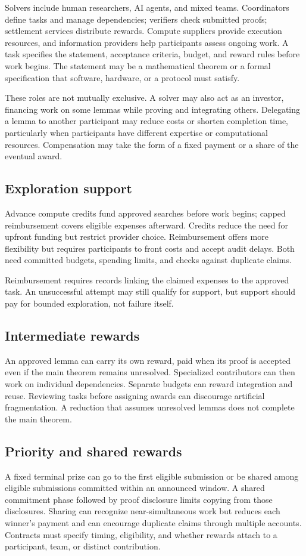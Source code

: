 \documentclass[11pt,a4paper,reqno]{amsart}
\numberwithin{equation}{section}
\begin{document}
Solvers include human researchers, AI agents, and mixed teams. Coordinators define tasks and manage dependencies; verifiers check submitted proofs; settlement services distribute rewards. Compute suppliers provide execution resources, and information providers help participants assess ongoing work. A task specifies the statement, acceptance criteria, budget, and reward rules before work begins. The statement may be a mathematical theorem or a formal specification that software, hardware, or a protocol must satisfy.

These roles are not mutually exclusive. A solver may also act as an investor, financing work on some lemmas while proving and integrating others. Delegating a lemma to another participant may reduce costs or shorten completion time, particularly when participants have different expertise or computational resources. Compensation may take the form of a fixed payment or a share of the eventual award.

\subsection{Exploration support}
Advance compute credits fund approved searches before work begins; capped reimbursement covers eligible expenses afterward. Credits reduce the need for upfront funding but restrict provider choice. Reimbursement offers more flexibility but requires participants to front costs and accept audit delays. Both need committed budgets, spending limits, and checks against duplicate claims.

Reimbursement requires records linking the claimed expenses to the approved task. An unsuccessful attempt may still qualify for support, but support should pay for bounded exploration, not failure itself.

\subsection{Intermediate rewards}
An approved lemma can carry its own reward, paid when its proof is accepted even if the main theorem remains unresolved. Specialized contributors can then work on individual dependencies. Separate budgets can reward integration and reuse. Reviewing tasks before assigning awards can discourage artificial fragmentation. A reduction that assumes unresolved lemmas does not complete the main theorem.

\subsection{Priority and shared rewards}
A fixed terminal prize can go to the first eligible submission or be shared among eligible submissions committed within an announced window. A shared commitment phase followed by proof disclosure limits copying from those disclosures. Sharing can recognize near-simultaneous work but reduces each winner's payment and can encourage duplicate claims through multiple accounts. Contracts must specify timing, eligibility, and whether rewards attach to a participant, team, or distinct contribution.
\end{document}
